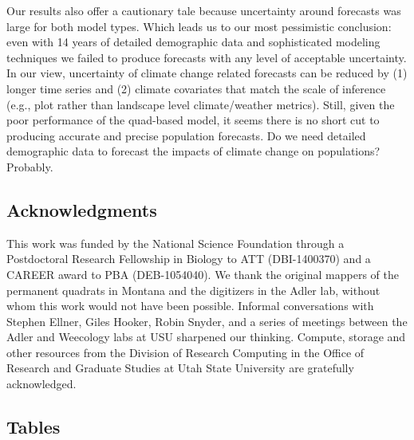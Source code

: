 \documentclass[12pt,]{article}
\begin{document}
Our results also offer a cautionary tale because uncertainty around
forecasts was large for both model types. Which leads us to our most
pessimistic conclusion: even with 14 years of detailed demographic data
and sophisticated modeling techniques we failed to produce forecasts
with any level of acceptable uncertainty. In our view, uncertainty of
climate change related forecasts can be reduced by (1) longer time
series and (2) climate covariates that match the scale of inference
(e.g., plot rather than landscape level climate/weather metrics). Still,
given the poor performance of the quad-based model, it seems there is no
short cut to producing accurate and precise population forecasts. Do we
need detailed demographic data to forecast the impacts of climate change
on populations? Probably.

\subsection{Acknowledgments}\label{acknowledgments}

This work was funded by the National Science Foundation through a
Postdoctoral Research Fellowship in Biology to ATT (DBI-1400370) and a
CAREER award to PBA (DEB-1054040). We thank the original mappers of the
permanent quadrats in Montana and the digitizers in the Adler lab,
without whom this work would not have been possible. Informal
conversations with Stephen Ellner, Giles Hooker, Robin Snyder, and a
series of meetings between the Adler and Weecology labs at USU sharpened
our thinking. Compute, storage and other resources from the Division of
Research Computing in the Office of Research and Graduate Studies at
Utah State University are gratefully acknowledged.

\pagebreak{}

\subsection{Tables}\label{tables}
\end{document}
